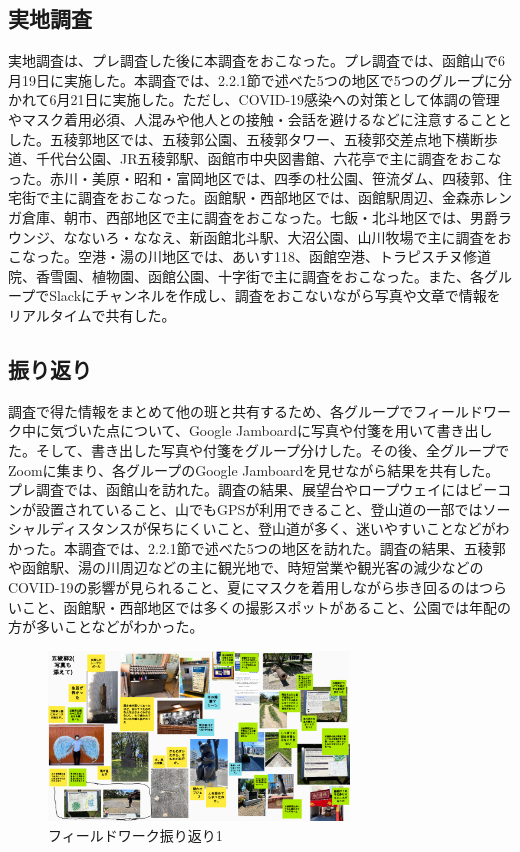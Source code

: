
\subsection{実地調査}
実地調査は、プレ調査した後に本調査をおこなった。プレ調査では、函館山で6月19日に実施した。本調査では、2.2.1節で述べた5つの地区で5つのグループに分かれて6月21日に実施した。ただし、COVID-19感染への対策として体調の管理やマスク着用必須、人混みや他人との接触・会話を避けるなどに注意することとした。五稜郭地区では、五稜郭公園、五稜郭タワー、五稜郭交差点地下横断歩道、千代台公園、JR五稜郭駅、函館市中央図書館、六花亭で主に調査をおこなった。赤川・美原・昭和・富岡地区では、四季の杜公園、笹流ダム、四稜郭、住宅街で主に調査をおこなった。函館駅・西部地区では、函館駅周辺、金森赤レンガ倉庫、朝市、西部地区で主に調査をおこなった。七飯・北斗地区では、男爵ラウンジ、なないろ・ななえ、新函館北斗駅、大沼公園、山川牧場で主に調査をおこなった。空港・湯の川地区では、あいす118、函館空港、トラピスチヌ修道院、香雪園、植物園、函館公園、十字街で主に調査をおこなった。また、各グループでSlackにチャンネルを作成し、調査をおこないながら写真や文章で情報をリアルタイムで共有した。


\subsection{振り返り}
調査で得た情報をまとめて他の班と共有するため、各グループでフィールドワーク中に気づいた点について、Google Jamboardに写真や付箋を用いて書き出した。そして、書き出した写真や付箋をグループ分けした。その後、全グループでZoomに集まり、各グループのGoogle Jamboardを見せながら結果を共有した。プレ調査では、函館山を訪れた。調査の結果、展望台やロープウェイにはビーコンが設置されていること、山でもGPSが利用できること、登山道の一部ではソーシャルディスタンスが保ちにくいこと、登山道が多く、迷いやすいことなどがわかった。本調査では、2.2.1節で述べた5つの地区を訪れた。調査の結果、五稜郭や函館駅、湯の川周辺などの主に観光地で、時短営業や観光客の減少などのCOVID-19の影響が見られること、夏にマスクを着用しながら歩き回るのはつらいこと、函館駅・西部地区では多くの撮影スポットがあること、公園では年配の方が多いことなどがわかった。


\begin{figure}[htbp]
    \begin{center}
    \includegraphics[width=8cm]{images/FW1.png}
    \end{center}
    \caption{フィールドワーク振り返り1}
    \label{fig:furikaeri1}
\end{figure}

